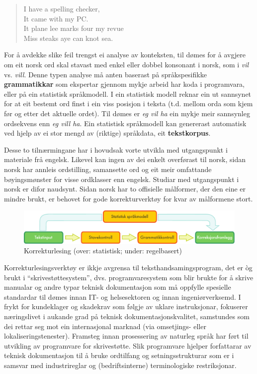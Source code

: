 \begin{multicols}{2}
\begin{quote}
  I have a spelling checker,\\
  It came with my PC.\\
  It plane lee marks four my revue\\
  Miss steaks aye can knot sea.
\end{quote}

For å avdekke slike feil trengst ei analyse av konteksten, til dømes for å avgjere om eit norsk ord skal stavast med enkel eller dobbel konsonant i norsk, som i \textit{vil} vs. \textit{vill}.
Denne typen analyse må anten baserast på språkspesifikke \textbf{grammatikkar} som ekspertar gjennom mykje arbeid har koda i programvara, eller på ein statistisk språkmodell. 
I ein statistisk modell reknar ein ut sannsynet for at eit bestemt ord finst i ein viss posisjon i teksta (t.d. mellom orda som kjem før og etter det aktuelle ordet). Til dømes er \textit{eg vil ha} ein mykje meir sannsynleg ordsekvens enn \textit{eg vill ha}. Ein statistisk språkmodell kan genererast automatisk ved hjelp av ei stor mengd av (riktige) språkdata, eit \textbf{tekstkorpus}. 

Desse to tilnærmingane har i hovudsak vorte utvikla med utgangspunkt i materiale frå engelsk. Likevel kan ingen av dei enkelt overførast til norsk, sidan norsk har annleis ordstilling, samansette ord og eit meir omfattande bøyingsmønster for visse ordklasser enn engelsk. Studiar med utgangspunkt i norsk er difor naudsynt. Sidan norsk har to offisielle målformer, der den eine er mindre brukt, er behovet for gode korrekturverktøy for kvar av målformene stort. 

\begin{figure}[htb]
  \center
  \includegraphics[width=\textwidth]{../_media/norwegian-nynorsk/language_checking}
  \caption{Korrekturlesing (over: statistisk; under: regelbasert)}
  \label{fig:langcheckingaarch_no}
\end{figure}

Korrekturlesingsverktøy er ikkje avgrensa til teksthandsamingsprogram, det er òg brukt i “skrivestøttesystem”, dvs. programvaresystem som blir brukte for å skrive manualar og andre typar teknisk dokumentasjon som må oppfylle spesielle standardar til dømes innan IT- og helsesektoren og innan ingeniørverksemd. I frykt for kundeklager og skadekrav som følgje av uklare instruksjonar, fokuserer næringslivet i aukande grad på teknisk dokumentasjonskvalitet, samstundes som dei rettar seg mot ein internasjonal marknad (via omsetjings- eller lokaliseringstenester). Framsteg innan prosessering av naturleg språk har ført til utvikling av programvare for skrivestøtte. Slik programvare hjelper forfattarar av teknisk dokumentasjon til å bruke ordtilfang og setningsstrukturar som er i samsvar med industrireglar og (bedriftsinterne) terminologiske restriksjonar. 


\end{multicols}
